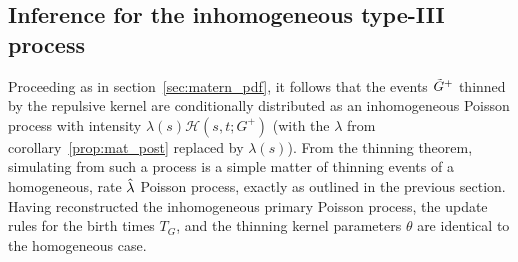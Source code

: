\documentclass{statsoc}
\begin{document}
\subsection{Inference for the inhomogeneous \matern type-III process}



Proceeding as in section~\ref{sec:matern_pdf},
it follows that the events $\tilde{G}^+$ thinned by the repulsive kernel are conditionally distributed as an inhomogeneous Poisson process with 
intensity $\lambda(s) \mathscr{H}(s,t;G^+)$ (with the $\lambda$ from corollary~\ref{prop:mat_post} replaced by $\lambda(s)$). From the thinning theorem, simulating from such a process is a simple matter of thinning events of a homogeneous,
rate $\hat{\lambda}$ Poisson process, exactly as outlined in 
the previous section. Having reconstructed the inhomogeneous primary Poisson process, the update rules for the birth times $T_G$, and the thinning kernel parameters 
$\theta$ are identical to the homogeneous case. 
\end{document}
